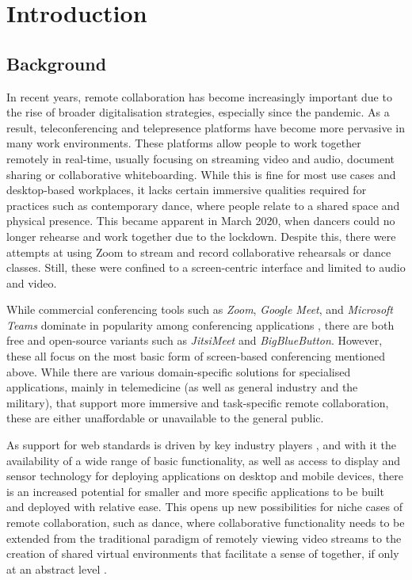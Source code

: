 \chapter{Introduction}

\section{Background}

In recent years, remote collaboration has become increasingly important due to the rise of broader digitalisation strategies, especially since the pandemic. As a result, teleconferencing and telepresence platforms have become more pervasive in many work environments. These platforms allow people to work together remotely in real-time, usually focusing on streaming video and audio, document sharing or collaborative whiteboarding. While this is fine for most use cases and desktop-based workplaces, it lacks certain immersive qualities required for practices such as contemporary dance, where people relate to a shared space and physical presence. This became apparent in March 2020, when dancers could no longer rehearse and work together due to the lockdown. Despite this, there were attempts at using Zoom to stream and record collaborative rehearsals or dance classes. Still, these were confined to a screen-centric interface and limited to audio and video.

While commercial conferencing tools such as \emph{Zoom}, \emph{Google Meet}, and \emph{Microsoft Teams} dominate in popularity among conferencing applications \parencite{mostPopularConferencingPlatforms}, there are both free and open-source variants such as \emph{JitsiMeet} and \emph{BigBlueButton}. However, these all focus on the most basic form of screen-based conferencing mentioned above. While there are various domain-specific solutions for specialised applications, mainly in telemedicine (as well as general industry and the military), that support more immersive and task-specific remote collaboration, these are either unaffordable or unavailable to the general public.

As support for web standards is driven by key industry players \parencite{pushingInteroperabilityForward}, and with it the availability of a wide range of basic functionality, as well as access to display and sensor technology for deploying applications on desktop and mobile devices, there is an increased potential for smaller and more specific applications to be built and deployed with relative ease. This opens up new possibilities for niche cases of remote collaboration, such as dance, where collaborative functionality needs to be extended from the traditional paradigm of remotely viewing video streams to the creation of shared virtual environments that facilitate a sense of  together, if only at an abstract level \parencite{surveyOfPresence}.

